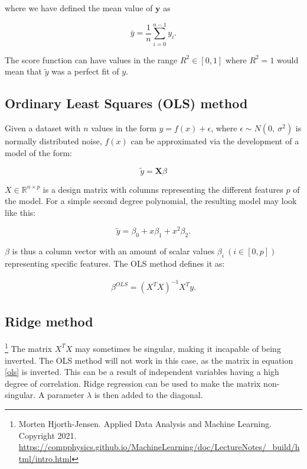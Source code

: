 \documentclass[reprint,english,notitlepage]{revtex4-1}  %
\begin{document}
where we have defined the mean value  of $\bm{y}$ as

\[
\bar{y} =  \frac{1}{n} \sum_{i=0}^{n - 1} y_i.
\]

The score function can have values in the range $R^2 \in [0, 1]$ where $R^2 = 1$ would mean that $\tilde{y}$ was a perfect fit of $y$.

\subsection{Ordinary Least Squares (OLS) method}

Given a dataset with $n$ values in the form $y = f(x) + \epsilon$, where $\epsilon \sim N(0, \ \sigma^2)$ is normally distributed noise, $f(x)$ can be approximated via the development of a model of the form:

\begin{equation} \label{eq:predict}
    \tilde{y} = \bm{X}\beta
\end{equation}


$X \in \mathbb{R}^{n \times p}$ is a design matrix with columns representing the different features $p$ of the model. For a simple second degree polynomial, the resulting model may look like this:

$$\tilde{y} = \beta_0 + x\beta_1 + x^2\beta_2.$$

$\beta$ is thus a column vector with an amount of scalar values $\beta_i \ (i \in [0, p])$ representing specific features. The OLS method defines it as:



\begin{align}
    \label{ols}
    \beta^{OLS} = (X^TX)^{-1}X^Ty.
\end{align}


\subsection{Ridge method}



\footnote{\label{ref1} Morten Hjorth-Jensen. Applied Data Analysis and Machine Learning. Copyright 2021. \url{https://compphysics.github.io/MachineLearning/doc/LectureNotes/_build/html/intro.html}} The matrix $X^TX$ may sometimes be singular, making it incapable of being inverted. The OLS method will not work in this case, as the matrix in equation \ref{ols} is inverted. This can be a result of independent variables having a high degree of correlation. Ridge regression can be used to make the matrix non-singular. A parameter $\lambda$ is then added to the diagonal.
\end{document}

